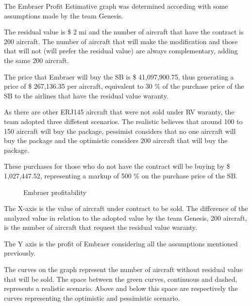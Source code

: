 ﻿The Embraer Profit Estimative graph was determined according with some assumptions made by the team Genesis.

The residual value is \$ 2 mi and the number of aircraft that have the contract is 200 aircraft. The number of aircraft that will make the
modification and those that will not (will prefer the residual value) are always complementary, adding the same 200 aircraft.

The price that Embraer will buy the SB is \$ 41,097,900.75, thus generating a price of \$ 267,136.35 per aircraft, equivalent to 30 \% of
the purchase price of the SB to the airlines that have the residual value waranty.

As there are other ERJ145 aircraft that were not sold under RV waranty, the team adopted three diffetent scenarios. The realistic believes
that around 100 to 150 aircraft will buy the package, pessimist considers that no one aircraft will buy the package and the optimistic considers
200 aircraft that will buy the package.

These purchases for those who do not have the contract will be buying by \$ 1,027,447.52, representing a markup of 500 \% on the purchase price of the SB.


\begin{figure}[H] %
\caption{Embraer profitability}
\label{fig:EmbProfEstim}
\end{figure}

The X-axis is the value of aircraft under contract to be sold. The difference of the analyzed value in relation to the adopted value by the team Genesis, 200 aircraft,
is the number of aircraft that request the residual value waranty.

The Y axis is the profit of Embraer considering all the assumptions mentioned previously.

The curves on the graph represent the number of aircraft without residual value that will be sold. The space between the green curves, continuous and dashed, represents a realistic scenario. 
Above and below this space are respectively the curves representing the optimistic and pessimistic scenario.

